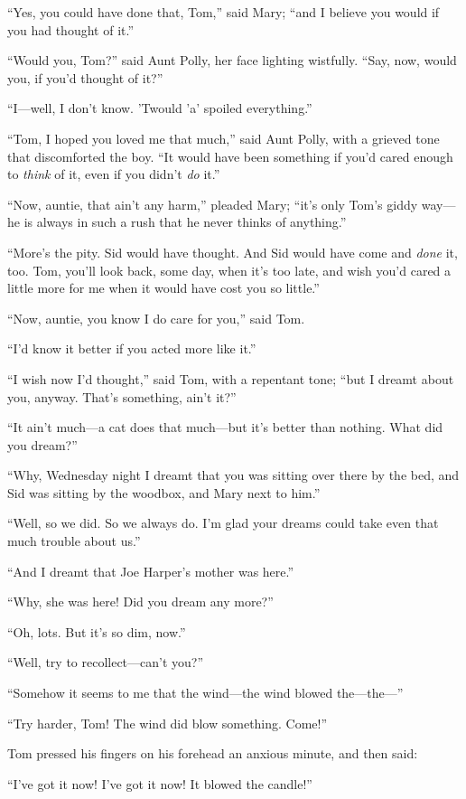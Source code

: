 \documentclass{book}
\begin{document}
“Yes, you could have done that, Tom,” said Mary; “and I believe you would if you had thought of it.”

“Would you, Tom?” said Aunt Polly, her face lighting wistfully. “Say, now, would you, if you’d thought of it?”

“I—well, I don’t know. ’Twould ’a’ spoiled everything.”

“Tom, I hoped you loved me that much,” said Aunt Polly, with a grieved tone that discomforted the boy. “It would have been something if you’d cared enough to \emph{think} of it, even if you didn’t \emph{do} it.”

“Now, auntie, that ain’t any harm,” pleaded Mary; “it’s only Tom’s giddy way—he is always in such a rush that he never thinks of anything.”

“More’s the pity. Sid would have thought. And Sid would have come and \emph{done} it, too. Tom, you’ll look back, some day, when it’s too late, and wish you’d cared a little more for me when it would have cost you so little.”

“Now, auntie, you know I do care for you,” said Tom.

“I’d know it better if you acted more like it.”

“I wish now I’d thought,” said Tom, with a repentant tone; “but I dreamt about you, anyway. That’s something, ain’t it?”

“It ain’t much—a cat does that much—but it’s better than nothing. What did you dream?”

“Why, Wednesday night I dreamt that you was sitting over there by the bed, and Sid was sitting by the woodbox, and Mary next to him.”

“Well, so we did. So we always do. I’m glad your dreams could take even that much trouble about us.”

“And I dreamt that Joe Harper’s mother was here.”

“Why, she was here! Did you dream any more?”

“Oh, lots. But it’s so dim, now.”

“Well, try to recollect—can’t you?”

“Somehow it seems to me that the wind—the wind blowed the—the—”

“Try harder, Tom! The wind did blow something. Come!”

Tom pressed his fingers on his forehead an anxious minute, and then said:

“I’ve got it now! I’ve got it now! It blowed the candle!”
\end{document}
